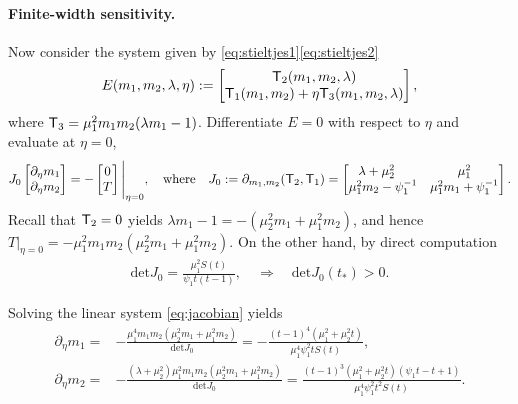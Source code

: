 \documentclass{article} %
\begin{document}
\paragraph{Finite-width sensitivity.}
Now consider the system given by \eqref{eq:stieltjes1}\eqref{eq:stieltjes2}
\[
E(m_1,m_2,\lambda,\eta) := \begin{bmatrix}
    {\mathsf T}_2(m_1,m_2,\lambda) \\ {\mathsf T}_1(m_1,m_2) + \eta {\mathsf T}_3(m_1,m_2,\lambda)
\end{bmatrix},
\]
where ${\mathsf T}_3 = \mu_1^2m_1m_2(\lambda m_1-1)$. Differentiate $E=0$ with respect to $\eta$ and evaluate at $\eta=0$,
\begin{align}
J_0\begin{bmatrix}
    \partial_{\eta} m_1 \\ \partial_{\eta} m_2
\end{bmatrix}
= - \begin{bmatrix}
    0 \\ T
\end{bmatrix} \Bigg|_{\eta=0}, \quad \text{where} \quad
J_0 := \partial_{m_1,m_2}({\mathsf T}_2,{\mathsf T}_1) = \begin{bmatrix}
    \lambda+\mu_2^2\quad &\mu_1^2 \\ \mu_1^2m_2-\psi_1^{-1}  &\mu_1^2m_1+\psi_1^{-1}
\end{bmatrix}. \label{eq:jacobian}
\end{align}
Recall that ${\mathsf T}_2=0$ yields $\lambda m_1-1 = -(\mu_2^2m_1+\mu_1^2m_2)$, and hence $T|_{\eta=0} = -\mu_1^2m_1m_2(\mu_2^2m_1+\mu_1^2m_2)$. 
On the other hand, by direct computation
\begin{align}
\mathrm{det}J_0 = \frac{\mu_1^2S(t)}{\psi_1 t(t-1)}, \quad \Rightarrow \quad
\mathrm{det}J_0(t_*)>0.
\label{eq:jacobian-invertibility}
\end{align}

Solving the linear system \eqref{eq:jacobian} yields
\begin{align*}
    \partial_\eta m_1 =& -\frac{\mu_1^4 m_1m_2(\mu_2^2m_1+\mu_1^2m_2)}{\mathrm{det} J_0} = -\frac{(t-1)^4(\mu_1^2+\mu_2^2t)}{\mu_1^4\psi_1^2 t S(t)}, \\
    \partial_\eta m_2 =& -\frac{(\lambda+\mu_2^2)\mu_1^2m_1m_2(\mu_2^2m_1+\mu_1^2m_2)}{\mathrm{det} J_0} = \frac{(t-1)^3(\mu_1^2+\mu_2^2t)(\psi_1t-t+1)}{\mu_1^4\psi_1^2t^2 S(t)}. 
\end{align*}
\end{document}
